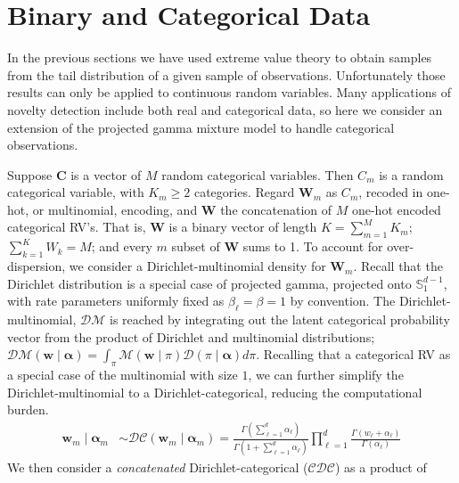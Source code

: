 \section{Binary and Categorical Data\label{sec:categorical}}
In the previous sections we have used extreme value theory to obtain samples
    from the tail distribution of a given sample of observations. Unfortunately 
    those results can only be applied to continuous random variables.  Many 
    applications of novelty detection include both real and categorical 
    data, so here we consider an extension of the projected gamma mixture model 
    to handle categorical observations. 

Suppose $\bm{C}$ is a vector of $M$ random categorical variables.  Then $C_m$ 
    is a random categorical variable, with $K_{m} \geq 2$ categories. Regard 
    $\bm{W}_m$ as $C_m$, recoded in one-hot, or multinomial, encoding, and 
    $\bm{W}$ the concatenation of $M$ one-hot encoded categorical RV's. That is, 
    $\bm{W}$ is a binary vector of length $K = \sum_{m = 1}^M K_{m}$; 
    $\sum_{k = 1}^K W_k = M$; and every $m$ subset of $\bm{W}$ sums to 1.
    To account for over-dispersion, we consider a Dirichlet-multinomial 
    density for $\bm{W}_m$. Recall that the Dirichlet distribution is a 
    special case of projected gamma, projected onto $\mathbb{S}_1^{d-1}$, 
    with rate parameters uniformly fixed as $\beta_{\ell} = \beta = 1$ 
    by convention.  The Dirichlet-multinomial, $\mathcal{DM}$
    is reached by integrating out the latent categorical probability vector 
    from the product of Dirichlet and multinomial distributions; 
    $\mathcal{DM}(\bm{w}\mid\bm{\alpha}) = \int_{\pi}\mathcal{M}(\bm{w}\mid\pi)\mathcal{D}(\pi\mid\bm{\alpha})d\pi$.
    Recalling that a categorical RV as a special case of the multinomial with 
    size $1$, we can further simplify the Dirichlet-multinomial to a 
    Dirichlet-categorical, reducing the computational burden.
    \begin{equation}
        \begin{aligned}
        \label{eqn:dirmultinom}
        \bm{w}_{m}\mid\bm{\alpha}_m 
        &\sim 
        \mathcal{DC}(\bm{w}_m\mid\bm{\alpha}_m) = 
        \frac{\Gamma(\sum_{\ell=1}^d \alpha_{\ell})}{\Gamma(1 + \sum_{\ell = 1}^d\alpha_{\ell})}
        \prod_{\ell = 1}^d \frac{\Gamma(w_{\ell} + \alpha_{\ell})}{\Gamma(\alpha_{\ell})}
        \end{aligned}
    \end{equation}
    We then consider a \emph{concatenated} 
    Dirichlet-categorical ($\mathcal{CDC}$) as a product of 
